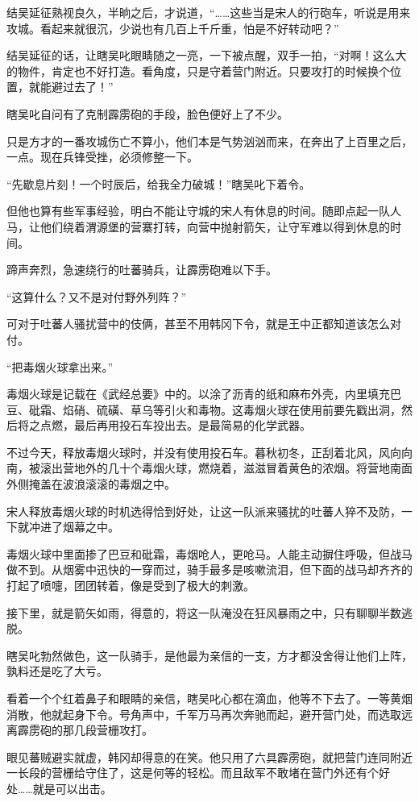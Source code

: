 结吴延征熟视良久，半晌之后，才说道，“……这些当是宋人的行砲车，听说是用来攻城。看起来就很沉，少说也有几百上千斤重，怕是不好转动吧？”

结吴延征的话，让瞎吴叱眼睛随之一亮，一下被点醒，双手一拍，“对啊！这么大的物件，肯定也不好打造。看角度，只是守着营门附近。只要攻打的时候换个位置，就能避过去了！”

瞎吴叱自问有了克制霹雳砲的手段，脸色便好上了不少。

只是方才的一番攻城伤亡不算小，他们本是气势汹汹而来，在奔出了上百里之后，一点。现在兵锋受挫，必须修整一下。

“先歇息片刻！一个时辰后，给我全力破城！”瞎吴叱下着令。

但他也算有些军事经验，明白不能让守城的宋人有休息的时间。随即点起一队人马，让他们绕着渭源堡的营寨打转，向营中抛射箭矢，让守军难以得到休息的时间。

蹄声奔烈，急速绕行的吐蕃骑兵，让霹雳砲难以下手。

“这算什么？又不是对付野外列阵？”

可对于吐蕃人骚扰营中的伎俩，甚至不用韩冈下令，就是王中正都知道该怎么对付。

“把毒烟火球拿出来。”

毒烟火球是记载在《武经总要》中的。以涂了沥青的纸和麻布外壳，内里填充巴豆、砒霜、焰硝、硫磺、草乌等引火和毒物。这毒烟火球在使用前要先戳出洞，然后将之点燃，最后再用投石车投出去。是最简易的化学武器。

不过今天，释放毒烟火球时，并没有使用投石车。暮秋初冬，正刮着北风，风向向南，被滚出营地外的几十个毒烟火球，燃烧着，滋滋冒着黄色的浓烟。将营地南面外侧掩盖在波浪滚滚的毒烟之中。

宋人释放毒烟火球的时机选得恰到好处，让这一队派来骚扰的吐蕃人猝不及防，一下就冲进了烟幕之中。

毒烟火球中里面掺了巴豆和砒霜，毒烟呛人，更呛马。人能主动摒住呼吸，但战马做不到。从烟雾中迅快的一穿而过，骑手最多是咳嗽流泪，但下面的战马却齐齐的打起了喷嚏，团团转着，像是受到了极大的刺激。

接下里，就是箭矢如雨，得意的，将这一队淹没在狂风暴雨之中，只有聊聊半数逃脱。

瞎吴叱勃然做色，这一队骑手，是他最为亲信的一支，方才都没舍得让他们上阵，孰料还是吃了大亏。

看着一个个红着鼻子和眼睛的亲信，瞎吴叱心都在滴血，他等不下去了。一等黄烟消散，他就起身下令。号角声中，千军万马再次奔驰而起，避开营门处，而选取远离霹雳砲的那几段营栅攻打。

眼见蕃贼避实就虚，韩冈却得意的在笑。他只用了六具霹雳砲，就把营门连同附近一长段的营栅给守住了，这是何等的轻松。而且敌军不敢堵在营门外还有个好处……就是可以出击。

